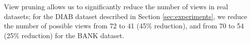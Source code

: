 View pruning allows us to significantly reduce the number of views in real
datasets; for the DIAB dataset described in Section \ref{sec:experiments},
we reduce the number of possible views from 72 to 41 (45\% reduction), and from
70 to 54 (25\% reduction) for the BANK dataset. 






